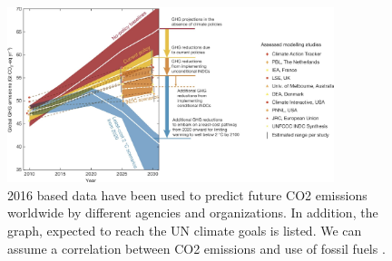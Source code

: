 \begin{figure}
  \centering
  \includegraphics[width=0.85\textwidth]{graphics/politics_trend.jpg}
  \caption{2016 based data have been used to predict future CO2 emissions worldwide by different agencies and organizations. In addition, the graph, expected to reach the UN climate goals is listed. We can assume a correlation between CO2 emissions and use of fossil fuels \cite{UN_Climate_Goals}.}
  \label{fig:prognosis}
\end{figure}


